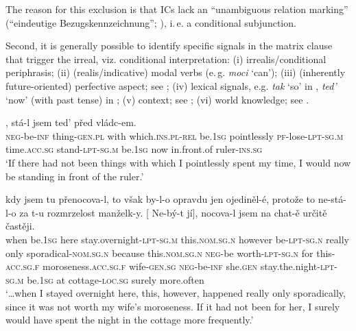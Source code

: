 \documentclass[output=paper,colorlinks,citecolor=brown,
modfonts,newtxmath
]{langscibook}
\begin{document}
\noindent The reason for this exclusion is that ICs lack an ``unambiguous relation marking'' (``eindeutige Bezugskennzeichnung''; \citealt[135]{Reis1997}), i.\,e. a conditional subjunction.

Second, it is generally possible to identify specific signals in the matrix clause that trigger the irreal, viz. conditional interpretation: (i) irrealis/conditional periphrasis; (ii) (realis/indicative) modal verbs (e.\,g. \textit{moci} `can'); (iii) (inherently future-oriented) perfective aspect; see ; (iv) lexical signals, e.g. \textit{tak} `so' in , \textit{ted'} `now' (with past tense) in ; (v) context; see ; (vi) world knowledge; see .

\ea\label{ex:ruler}
, stá-l jsem ted' před vládc-em. \\
	{} \textsc{neg}-be-\textsc{inf} thing-\textsc{gen.pl} with which.\textsc{ins.pl}-\textsc{rel} be.\textsc{1sg} pointlessly \textsc{pf}-lose-\textsc{lpt-sg.m} time.\textsc{acc.sg} stand-\textsc{lpt-sg.m} be.\textsc{1sg} now {in.front.of} ruler-\textsc{ins.sg} \\
\glt `If there had not been things with which I pointlessly spent my time, I would now be standing in front of the ruler.’ \hfill \citep[Czech;][5]{Milotova2012}
\z

\ea\label{ex:kontext}
\gll {\ldots}\hspace{-2pt} kdy jsem tu přenocova-l, to však by-l-o opravdu jen ojediněl-é, protože to ne-stá-l-o za t-u rozmrzelost manželk-y. [\hspace{-2pt} Ne-bý-t jí], nocova-l jsem na chat-ě určitě častěji.\\
	{} when be.\textsc{1sg} here {stay.overnight}-\textsc{lpt-sg.m} this.\textsc{nom.sg.n} however be-\textsc{lpt-sg.n} really only sporadical-\textsc{nom.sg.n} because this.\textsc{nom.sg.n} \textsc{neg}-{be worth}-\textsc{lpt-sg.n} for this-\textsc{acc.sg.f} moroseness.\textsc{acc.sg.f} wife-\textsc{gen.sg} {} \textsc{neg}-be-\textsc{inf} she.\textsc{gen} {stay.the.night}-\textsc{lpt-sg.m} be.\textsc{1sg} at cottage-\textsc{loc.sg} surely more.often \\
\glt `\ldots when I stayed overnight here, this, however, happened really only sporadically, since it was not worth my wife's moroseness. If it had not been for her, I surely would have spent the night in the cottage more frequently.' \hfill \citep[Czech;][5]{Milotova2012}
\z
\end{document}
